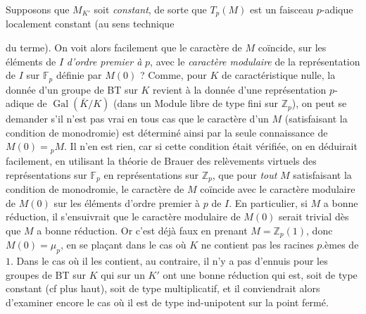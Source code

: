 \documentclass[11pt,a4paper]{article}
\begin{document}
Supposons que $M_{K'}$ soit \emph{constant}, de sorte que $T_p(M)$ est un
faisceau $p$-adique localement constant (au sens technique


du terme). On voit alors facilement que le caractère de $M$ coïncide, sur
les éléments de $I$ \emph{d'ordre premier à} $p$, avec le \emph{caractère
modulaire} de la représentation de $I$ sur $\mathbb{F}_p$ définie par
$M(0)$ ?
Comme, pour $K$ de caractéristique nulle, la donnée d'un groupe de BT sur
$K$ revient à la donnée d'une représentation $p$-adique de
$\operatorname{Gal}(\bar K/K)$ (dans un Module libre de type fini sur
$\mathbb{Z}_p$), on peut se demander s'il n'est pas vrai en tous cas que le
caractère d'un $M$ (satisfaisant la condition de monodromie) est déterminé
ainsi par la seule connaissance de $M(0) = {}_{p}M$. Il n'en est rien, car
si cette condition était vérifiée, on en déduirait facilement, en utilisant
la théorie de Brauer des relèvements virtuels des représentations sur
$\mathbb{F}_p$ en représentations sur $\mathbb{Z}_p$, que pour \emph{tout}
$M$ satisfaisant la condition de monodromie, le caractère de $M$ coïncide
avec le caractère modulaire de $M(0)$ sur les éléments d'ordre premier à
$p$ de $I$. En particulier, si $M$ a bonne réduction, il s'ensuivrait que
le caractère modulaire de $M(0)$ serait trivial dès que $M$ a bonne
réduction.
Or c'est déjà faux en prenant $M = \mathbb{Z}_p(1)$, donc $M(0) = \mu_p$,
en se plaçant dans le cas où $K$ ne contient pas les racines $p$.èmes de
$1$.
Dans le cas où il les contient, au contraire, il n'y a pas d'ennuis pour
les groupes de BT sur $K$ qui sur un $K'$ ont une bonne réduction qui est,
soit de type constant (cf plus haut), soit de type multiplicatif, et il
conviendrait alors d'examiner encore le cas où il est de type
ind-unipotent sur la  point fermé.

\end{document}
